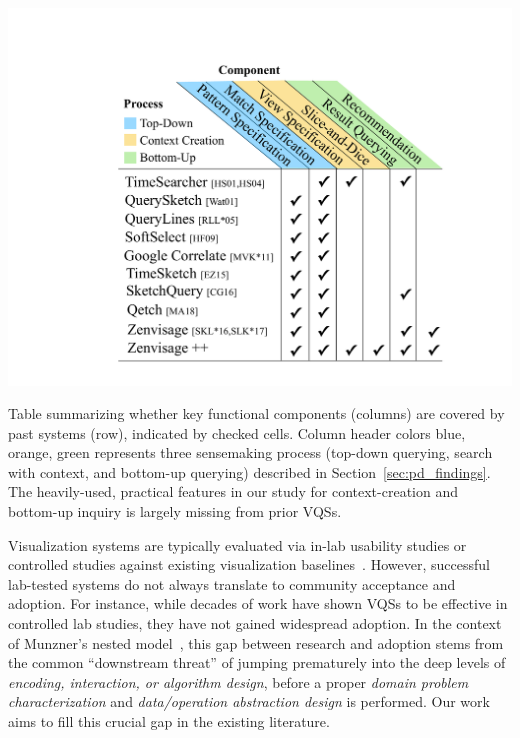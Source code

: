 {  %
  \begin{table}[h!]
    \vspace*{-10pt}
     \centering
     \includegraphics[width=0.8\linewidth]{figures/related_works_table.pdf}
     \caption{Table summarizing whether key functional components (columns) are covered by past systems (row), indicated by checked cells. Column header colors blue, orange, green represents three sensemaking process (top-down querying, search with context, and bottom-up querying) described in Section~\ref{sec:pd_findings}. The heavily-used, practical features in our study for context-creation and bottom-up inquiry is largely missing from prior VQSs.}
     \label{table:relatedwork}
     \vspace*{-15pt}
  \end{table}
  \par {}
  \npar Visualization systems are typically evaluated via in-lab usability studies or controlled studies against existing visualization baselines~\cite{Plaisant2004,North2006,Yi2008}. However, successful lab-tested systems do not always translate to community acceptance and adoption. For instance, while decades of work have shown VQSs to be effective in controlled lab studies, they have not gained widespread adoption.  In the context of Munzner's nested model~\cite{munzner2009nested}, this gap between research and adoption stems from the common ``downstream threat'' of jumping prematurely into the deep levels of \textit{encoding, interaction, or algorithm design}, before a proper \textit{domain problem characterization} and \textit{data/operation abstraction design} is performed. Our work aims to fill this crucial gap in the existing literature.
}
